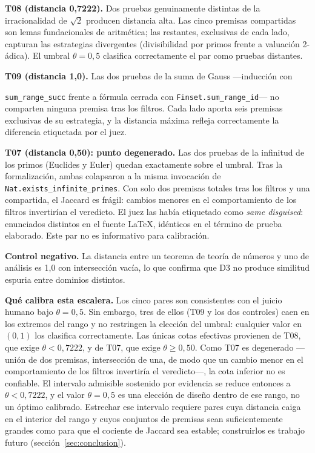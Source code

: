 \documentclass[12pt,a4paper]{article}
\theoremstyle{remark}
\begin{document}
\textbf{T08 (distancia 0{,}7222).} Dos pruebas genuinamente distintas de la irracionalidad de $\sqrt{2}$ producen distancia alta. Las cinco premisas compartidas son lemas fundacionales de aritmética; las restantes, exclusivas de cada lado, capturan las estrategias divergentes (divisibilidad por primos frente a valuación 2-ádica). El umbral $\theta = 0{,}5$ clasifica correctamente el par como pruebas distantes.

\textbf{T09 (distancia 1{,}0).} Las dos pruebas de la suma de Gauss —inducción con 

\noindent \texttt{sum\_range\_succ} frente a fórmula cerrada con \texttt{Finset.sum\_range\_id}— no comparten ninguna premisa tras los filtros. Cada lado aporta seis premisas exclusivas de su estrategia, y la distancia máxima refleja correctamente la diferencia etiquetada por el juez.

\textbf{T07 (distancia 0{,}50): punto degenerado.} Las dos pruebas de la infinitud de los primos (Euclides y Euler) quedan exactamente sobre el umbral. Tras la formalización, ambas colapsaron a la misma invocación de \texttt{Nat.exists\_infinite\_primes}. Con solo dos premisas totales tras los filtros y una compartida, el Jaccard es frágil: cambios menores en el comportamiento de los filtros invertirían el veredicto. El juez las había etiquetado como \textit{same disguised}: enunciados distintos en el fuente LaTeX, idénticos en el término de prueba elaborado. Este par no es informativo para calibración.

\textbf{Control negativo.} La distancia entre un teorema de teoría de números y uno de análisis es 1{,}0 con intersección vacía, lo que confirma que D3 no produce similitud espuria entre dominios distintos.

\textbf{Qué calibra esta escalera.} Los cinco pares son consistentes con el
juicio humano bajo $\theta = 0{,}5$. Sin embargo, tres de ellos (T09 y los dos
controles) caen en los extremos del rango y no restringen la elección del
umbral: cualquier valor en $(0,1)$ los clasifica correctamente. Las únicas
cotas efectivas provienen de T08, que exige $\theta < 0{,}7222$, y de T07, que
exige $\theta \geq 0{,}50$. Como T07 es degenerado ---unión de dos premisas,
intersección de una, de modo que un cambio menor en el comportamiento de los
filtros invertiría el veredicto---, la cota inferior no es confiable. El
intervalo admisible sostenido por evidencia se reduce entonces a
$\theta < 0{,}7222$, y el valor $\theta = 0{,}5$ es una elección de diseño
dentro de ese rango, no un óptimo calibrado. Estrechar ese intervalo requiere
pares cuya distancia caiga en el interior del rango y cuyos conjuntos de
premisas sean suficientemente grandes como para que el cociente de Jaccard sea
estable; construirlos es trabajo futuro (sección~\ref{sec:conclusion}).
\end{document}
